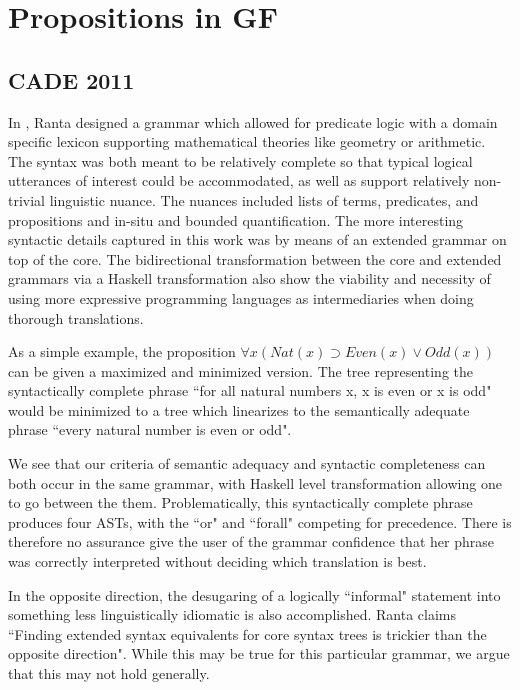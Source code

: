 \section{Propositions in GF}

\subsection{CADE 2011} \label{cade}

In \cite{rantaLog}, Ranta designed a grammar which allowed for predicate logic
with a domain specific lexicon supporting mathematical theories like geometry or
arithmetic. The syntax was both meant to be relatively complete so that typical
logical utterances of interest could be accommodated, as well as support
relatively non-trivial linguistic nuance. The nuances included lists of terms,
predicates, and propositions and in-situ and bounded quantification. The more
interesting syntactic details captured in this work was by means of an extended
grammar on top of the core. The bidirectional transformation between the core
and extended grammars via a Haskell transformation also show the viability and
necessity of using more expressive programming languages as intermediaries when
doing thorough translations.

As a simple example, the proposition $\forall x (Nat(x) \supset
Even(x) \lor Odd(x))$ can be given a maximized and minimized version. The tree
representing the syntactically complete phrase ``for all natural numbers
x, x is even or x is odd" would be minimized to a tree which linearizes to the
semantically adequate phrase ``every natural number is even or odd".

We see that our criteria of semantic adequacy and syntactic completeness can
both occur in the same grammar, with Haskell level transformation allowing one
to go between the them. Problematically, this syntactically complete phrase
produces four ASTs, with the ``or" and ``forall" competing for precedence. There
is therefore no assurance give the user of the grammar confidence that her
phrase was correctly interpreted without deciding which translation is best.

In the opposite direction, the desugaring of a logically ``informal" statement
into something less linguistically idiomatic is also accomplished. Ranta claims
``Finding extended syntax equivalents for core syntax trees is trickier than the
opposite direction". While this may be true for this particular grammar, we
argue that this may not hold generally.


